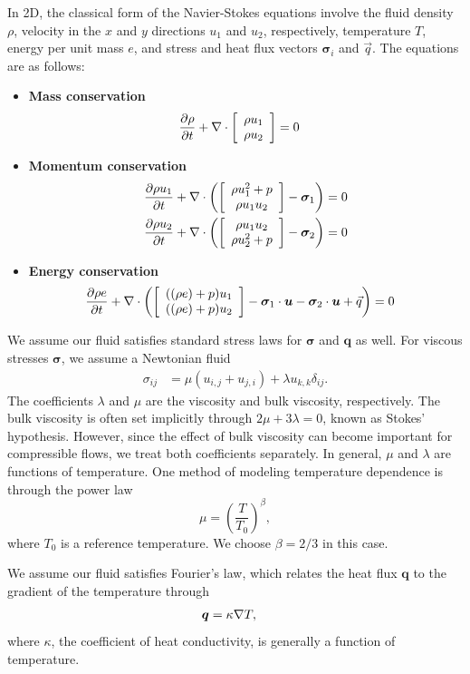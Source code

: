 In 2D, the classical form of the Navier-Stokes equations involve the fluid density $\rho$, velocity in the $x$ and $y$ directions $u_1$ and $u_2$, respectively, temperature $T$, energy per unit mass $e$, and stress and heat flux vectors $\boldsymbol \sigma_i$ and $\vec{q}$. The equations are as follows:
\begin{itemize}
\item{\textbf{Mass conservation}}
\begin{align*}
\pd{\rho}{t} + \div \vecttwo{\rho u_1 }{\rho u_2} &= 0
\end{align*}

\item{\textbf{Momentum conservation}}
\begin{align*}
\pd{\rho u_1}{t} + \div \left(\vecttwo{\rho u_1^2+p }{\rho u_1 u_2} - \boldsymbol \sigma_{1}\right) &=0\\
\pd{\rho u_2}{t} + \div \left(\vecttwo{\rho u_1 u_2}{\rho u_2^2+p } - \boldsymbol \sigma_{2}\right) &=0
\end{align*}

\item{\textbf{Energy conservation}}
\begin{align*}
\pd{\rho e}{t} + \div \left(\vecttwo{((\rho e)+p)u_1}{((\rho e)+p)u_2} - \boldsymbol \sigma_1 \cdot \boldsymbol u- \boldsymbol \sigma_2 \cdot \boldsymbol u + \vec{q}\right) &=0
\end{align*}
\end{itemize}

We assume our fluid satisfies standard stress laws for $\boldsymbol \sigma$ and $\boldsymbol q$ as well. For viscous stresses $\boldsymbol \sigma$, we assume a Newtonian fluid
\begin{align*}
\sigma_{ij} &= \mu(u_{i,j}+u_{j,i}) + \lambda u_{k,k}\delta_{ij}.
\end{align*}
The coefficients $\lambda$ and $\mu$ are the viscosity and bulk viscosity, respectively. The bulk viscosity is often set implicitly through $2\mu + 3\lambda = 0$, known as Stokes' hypothesis. However, since the effect of bulk viscosity can become important for compressible flows, we treat both coefficients separately. In general, $\mu$ and $\lambda$ are functions of temperature.  One method of modeling temperature dependence is through the power law
\[
\mu = \left(\frac{T}{T_0}\right)^\beta,
\]
where $T_0$ is a reference temperature. We choose $\beta = 2/3$ in this case. 

We assume our fluid satisfies Fourier's law, which relates the heat flux $\boldsymbol q$ to the gradient of the temperature through
\begin{align*}
{\boldsymbol q} &= \kappa \grad T,
\end{align*}
where $\kappa$, the coefficient of heat conductivity, is generally a function of temperature. 

